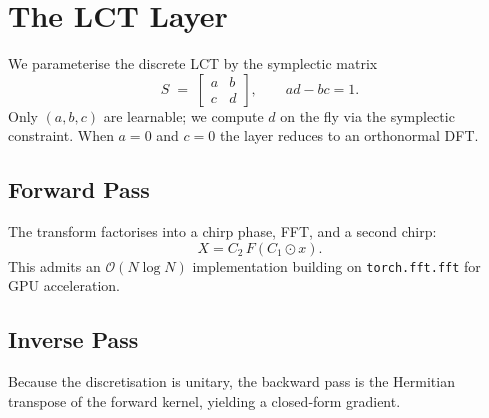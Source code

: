 \section{The \textsc{LCT} Layer}
We parameterise the discrete LCT by the symplectic matrix
\[ S \;=\;
  \begin{bmatrix} a & b \\ c & d
\end{bmatrix}, \qquad ad - bc = 1. \]
Only \((a,b,c)\) are learnable; we compute $d$ on the fly via the symplectic constraint.  When $a=0$ and $c=0$ the layer reduces to an orthonormal DFT.

\subsection{Forward Pass}
The transform factorises into a chirp phase, FFT, and a second chirp:
\[ X = C_2 \, F \left( C_1 \odot x \right). \]
This admits an $\mathcal{O}(N \log N)$ implementation building on
\verb|torch.fft.fft| for GPU acceleration.

\subsection{Inverse Pass}
Because the discretisation is unitary, the backward pass is the Hermitian transpose of the forward kernel, yielding a closed‐form gradient.